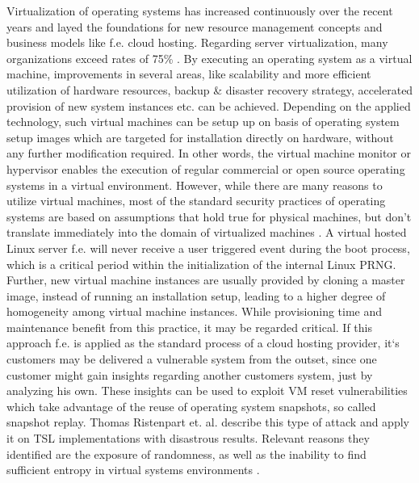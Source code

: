 Virtualization of operating systems has increased continuously over the recent years and layed the foundations for new resource management concepts and business models like f.e. cloud hosting. Regarding server virtualization, many organizations exceed rates of 75\% \cite{gartnervmmarket}. By executing an operating system as a virtual machine, improvements in several areas, like scalability and more efficient utilization of hardware resources, backup \& disaster recovery strategy, accelerated provision of new system instances etc. can be achieved. Depending on the applied technology, such virtual machines can be setup up on basis of operating system setup images which are targeted for installation directly on hardware, without any further modification required. In other words, the virtual machine monitor or hypervisor enables the execution of regular commercial or open source operating systems in a virtual environment. However, while there are many reasons to utilize virtual machines, most of the standard security practices of operating systems are based on assumptions that hold true for physical machines, but don't translate immediately into the domain of virtualized machines \cite{kerrigan2012study}. A virtual hosted Linux server f.e. will never receive a user triggered event during the boot process, which is a critical period within the initialization of the internal Linux PRNG. Further, new virtual machine instances are usually provided by cloning a master image, instead of running an installation setup, leading to a higher degree of homogeneity among virtual machine instances. While provisioning time and maintenance benefit from this practice, it may be regarded critical. If this approach f.e. is applied as the standard process of a cloud hosting provider, it`s customers may be delivered a vulnerable system from the outset, since one customer might gain insights regarding another customers system, just by analyzing his own. These insights can be used to exploit VM reset vulnerabilities which take advantage of the reuse of  operating system snapshots, so called snapshot replay. Thomas Ristenpart et. al. describe this type of attack and apply it on TSL implementations with disastrous results. Relevant reasons they identified are the exposure of randomness, as well as the inability to find sufficient entropy in virtual systems environments \cite{ristenpart2010good, ristenpart2009hey}. \\~\\
